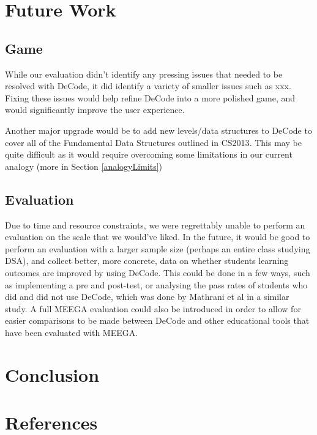 \documentclass[10pt]{article}
\begin{document}
\section{Future Work}
\subsection{Game}
While our evaluation didn't identify any pressing issues that needed to be resolved with DeCode, it did identify a variety of smaller issues such as xxx. Fixing these issues would help refine DeCode into a more polished game, and would significantly improve the user experience.\par
Another major upgrade would be to add new levels/data structures to DeCode to cover all of the Fundamental Data Structures outlined in CS2013\cite{CS2013}. This may be quite difficult as it would require overcoming some limitations in our current analogy (more in Section \ref{analogyLimits})
\subsection{Evaluation}
Due to time and resource constraints, we were regrettably unable to perform an evaluation on the scale that we would've liked. In the future, it would be good to perform an evaluation with a larger sample size (perhaps an entire class studying DSA), and collect better, more concrete, data on whether students learning outcomes are improved by using DeCode. This could be done in a few ways, such as implementing a pre and post-test, or analysing the pass rates of students who did and did not use DeCode, which was done by Mathrani et al\cite{mathrani} in a similar study. A full MEEGA\cite{Rafael} evaluation could also be introduced in order to allow for easier comparisons to be made between DeCode and other educational tools that have been evaluated with MEEGA.
\section{Conclusion}

\begingroup

\section*{References}
  \vspace{2mm}

  \renewcommand{\section}[2]{}

  \begin{spacing}{1.0}

    
    \small
    

  \end{spacing}

\endgroup
\end{document}
